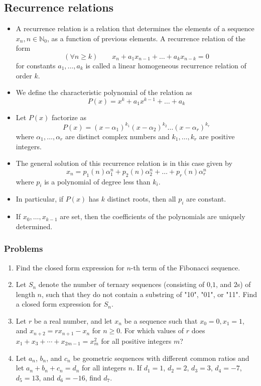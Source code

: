 \documentclass{article}
\begin{document}
	\subsection{Recurrence relations} %
		\begin{itemize}
			\item 
			A recurrence relation is a relation that determines the elements of a sequence $x_n, n \in \mathbb{N}_0$, as a function of previous elements. A recurrence relation of the form
			$$(\forall n \geq k) \hspace{2em} x_n + a_1x_{n-1} + \hdots + a_kx_{n-k} = 0$$
			for constants $a_1, \hdots, a_k$ is called a linear homogeneous recurrence relation of order $k$.
			\item	
			We define the characteristic polynomial of the relation as 
			$$P(x) = x^k + a_1x^{k-1} + \hdots + a_k$$
			\item
			Let $P(x)$	factorize as 
			$$P(x) = (x-\alpha_1)^{k_1}(x-\alpha_2)^{k_2} \hdots (x-\alpha_r)^{k_r}$$
			where $\alpha_1, \hdots , \alpha_r$ are distinct complex numbers and $k_1, \hdots, k_r$ are positive integers. 
			\item 
			The general solution of this recurrence relation is in this case given by
			$$x_n = p_1(n)\alpha_1^n + p_2(n)\alpha_2^n + \hdots + p_r(n)\alpha_r^n$$
			where $p_i$ is a polynomial of degree less than $k_i$.
			\item
			In particular, if $P(x)$ has $k$
			distinct roots, then all $p_i$ are constant.
			\item 
			If $x_0, \hdots, x_{k-1}$ are set, then the coefficients of the polynomials are uniquely determined.
		\end{itemize}
			
			\subsubsection*{Problems}
			\begin{enumerate}
				\item 
				Find the closed form expression for $n$-th term of the Fibonacci sequence.
				\item
				Let $S_n$ denote the number of ternary sequences (consisting of $0$,$1$, and $2$s) of length $n$, such that they do not contain a substring of "10", "01", or "11". Find a closed form expression for $S_n$.
				\item
				Let $r$ be a real number, and let $x_n$ be a sequence such that $x_0 = 0, x_1 = 1$, and $x_{n+2} = rx_{n+1} - x_n$ for $n \ge 0$. For which values of $r$ does $x_1 + x_3 + \cdots + x_{2m-1} = x_m^2$ for all positive integers $m$?
				\item
				Let $a_{n}$, $b_{n}$, and $c_{n}$ be geometric sequences with different common ratios and let $a_{n}+b_{n}+c_{n}=d_{n}$ for all integers $n$. If $d_{1}=1$, $d_{2}=2$, $d_{3}=3$, $d_{4}=-7$, $d_{5}=13$, and $d_{6}=-16$, find $d_{7}$.
			\end{enumerate}
\end{document}
